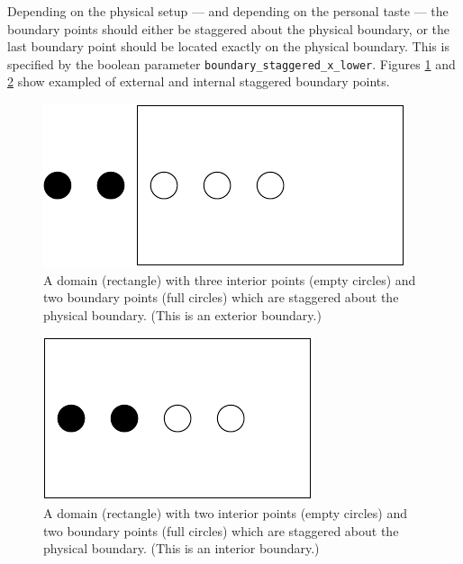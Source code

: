 Depending on the physical setup --- and depending on the personal
taste --- the boundary points should either be staggered about the
physical boundary, or the last boundary point should be located
exactly on the physical boundary.  This is specified by the boolean
parameter {\texttt{boundary\_staggered\_x\_lower}}.  Figures
{\ref{CactusBase:CoordBase:fig-domain-external-staggered}} and
{\ref{CactusBase:CoordBase:fig-domain-internal-staggered}} show
exampled of external and internal staggered boundary points.

\begin{figure}
\begin{center}
\includegraphics[scale=0.75]{domain-external-staggered}
\end{center}
\caption{A domain (rectangle) with three interior points (empty circles)
and two boundary points (full circles) which are staggered about the
physical boundary.  (This is an exterior boundary.)}
\label{CactusBase:CoordBase:fig-domain-external-staggered}
\end{figure}

\begin{figure}
\begin{center}
\includegraphics[scale=0.75]{domain-internal-staggered}
\end{center}
\caption{A domain (rectangle) with two interior points (empty circles)
and two boundary points (full circles) which are staggered about the
physical boundary.  (This is an interior boundary.)}
\label{CactusBase:CoordBase:fig-domain-internal-staggered}
\end{figure}

